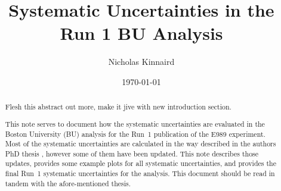 \documentclass[12pt,letterpaper]{article}
\title{Systematic Uncertainties in the Run 1 BU \wa Analysis}
\author{Nicholas Kinnaird}
\date{\today}
\begin{document}
\maketitle

\begin{abstract}
	Flesh this abstract out more, make it jive with new introduction section.

	This note serves to document how the systematic uncertainties are evaluated in the Boston University (BU) analysis for the Run~1 publication of the E989 experiment. Most of the systematic uncertainties are calculated in the way described in the authors PhD thesis \cite{phdthesis:2020Kinnaird}, however some of them have been updated. This note describes those updates, provides some example plots for all systematic uncertainties, and provides the final Run~1 systematic uncertainties for the analysis. This document should be read in tandem with the afore-mentioned thesis.
\end{abstract}

\tableofcontents












{}
\printbibliography

\end{document}
